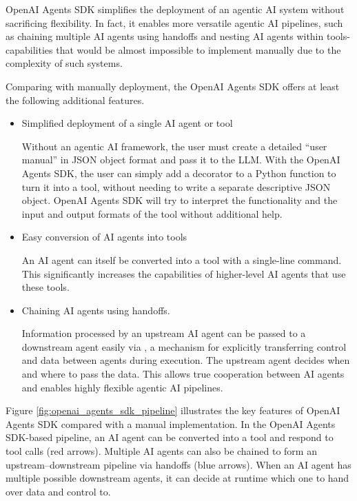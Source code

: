 OpenAI Agents SDK simplifies the deployment of an agentic AI system without sacrificing flexibility. In fact, it enables more versatile agentic AI pipelines, such as chaining multiple AI agents using handoffs and nesting AI agents within tools-capabilities that would be almost impossible to implement manually due to the complexity of such systems.

Comparing with manually deployment, the OpenAI Agents SDK offers at least the following additional features.

\begin{itemize}
	\item Simplified deployment of a single AI agent or tool
	
	Without an agentic AI framework, the user must create a detailed ``user manual'' in JSON object format and pass it to the LLM. With the OpenAI Agents SDK, the user can simply add a decorator to a Python function to turn it into a tool, without needing to write a separate descriptive JSON object. OpenAI Agents SDK will try to interpret the functionality and the input and output formats of the tool without additional help.
	
	\item Easy conversion of AI agents into tools
	
	An AI agent can itself be converted into a tool with a single-line command. This significantly increases the capabilities of higher-level AI agents that use these tools.
	
	\item Chaining AI agents using handoffs. 
	
	Information processed by an upstream AI agent can be passed to a downstream agent easily via , a mechanism for explicitly transferring control and data between agents during execution. The upstream agent decides when and where to pass the data. This allows true cooperation between AI agents and enables highly flexible agentic AI pipelines.
\end{itemize}

Figure \ref{fig:openai_agents_sdk_pipeline} illustrates the key features of OpenAI Agents SDK compared with a manual implementation. In the OpenAI Agents SDK-based pipeline, an AI agent can be converted into a tool and respond to tool calls (red arrows). Multiple AI agents can also be chained to form an upstream–downstream pipeline via handoffs (blue arrows). When an AI agent has multiple possible downstream agents, it can decide at runtime which one to hand over data and control to.

